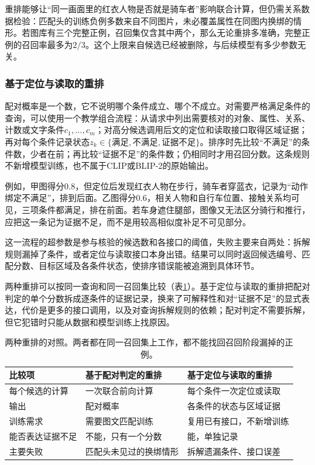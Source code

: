 重排能够让“同一画面里的红衣人物是否就是骑车者”影响联合计算，但仍需关系数据检验：匹配头的训练负例多数来自不同图片，未必覆盖属性在同图内换绑的情形。若图库有三个完整正例，召回集仅含其中两个，那么无论重排多准确，完整正例的召回率最多为$2/3$。这个上限来自候选已经被删除，与后续模型有多少参数无关。

\subsubsection{基于定位与读取的重排}
\label{sec:vision-understanding-constraint-check}

配对概率是一个数，它不说明哪个条件成立、哪个不成立。对需要严格满足条件的查询，可以使用一个教学组合流程：从请求中列出需要核对的对象、属性、关系、计数或文字条件$c_1,\ldots,c_m$；对高分候选调用后文的定位和读取接口取得区域证据；再对每个条件记录状态$z_k\in\{\text{满足},\text{不满足},\text{证据不足}\}$。排序时先比较“不满足”的条件数，少者在前；再比较“证据不足”的条件数；仍相同时才用召回分数。这条规则不新增模型训练，也不属于CLIP或BLIP-2的原始输出。

例如，甲图得分0.8，但定位后发现红衣人物在步行，骑车者穿蓝衣，记录为“动作绑定不满足”，排到后面。乙图得分0.6，相关人物和自行车位置、接触关系均可见，三项条件都满足，排在前面。若车身遮住腿部，图像又无法区分骑行和推行，应把这一条记为证据不足，而不是用较高相似度补足不可见部分。

这一流程的超参数是参与核验的候选数和各接口的阈值，失败主要来自两处：拆解规则漏掉了条件，或者定位与读取接口本身出错。结果可以同时返回候选编号、匹配分数、目标区域及各条件状态，使排序错误能被追溯到具体环节。

两种重排可以按同一查询和同一召回集比较（表\ref{tab:vision-understanding-rerank-compare}）。基于定位与读取的重排把配对判定的单个分数拆成逐条件的证据记录，换来了可解释性和对“证据不足”的显式表达，代价是更多的接口调用，以及对查询拆解规则的依赖；配对判定不需要拆解，但它犯错时只能从数据和模型训练上找原因。

\begin{table}[htbp]
  \centering
  \small
  \begin{tabularx}{\linewidth}{@{}p{16mm}XX@{}}
    \toprule
    比较项 & 基于配对判定的重排 & 基于定位与读取的重排\\
    \midrule
    每个候选的计算 & 一次联合前向计算 & 每个条件一次定位或读取\\
    输出 & 配对概率 & 各条件的状态与区域证据\\
    训练需求 & 需要图文匹配训练 & 复用已有接口，不新增训练\\
    能否表达证据不足 & 不能，只有一个分数 & 能，单独记录\\
    主要失败 & 匹配头未见过的换绑情形 & 拆解遗漏条件、接口误差\\
    \bottomrule
  \end{tabularx}
  \caption{两种重排的对照。两者都在同一召回集上工作，都不能找回召回阶段漏掉的正例。}
  \label{tab:vision-understanding-rerank-compare}
\end{table}

